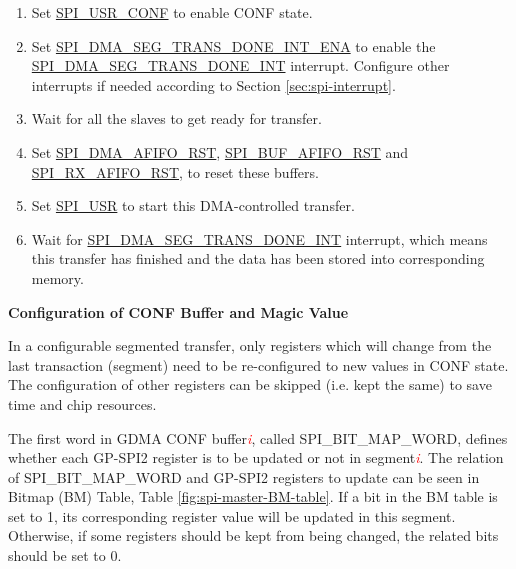 \documentclass[main\_\_EN.tex]{subfiles}
\begin{document}
\begin{enumerate}
   \item Set \hyperref[fielddesc:SPIUSRCONF]{SPI\_USR\_CONF} to enable CONF state.
   \item Set \hyperref[fielddesc:SPIDMASEGTRANSDONEINTENA]{SPI\_DMA\_SEG\_TRANS\_DONE\_INT\_ENA} to enable the \hyperref[int:SPIDMASEGTRANSDONEINT]{SPI\_DMA\_SEG\_TRANS\_DONE\_INT} interrupt. Configure other interrupts if needed according to Section \ref{sec:spi-interrupt}.

   \item Wait for all the slaves to get ready for transfer.

    \item Set \hyperref[fielddesc:SPIDMAAFIFORST]{SPI\_DMA\_AFIFO\_RST}, \hyperref[fielddesc:SPIBUFAFIFORST]{SPI\_BUF\_AFIFO\_RST} and \hyperref[fielddesc:SPIRXAFIFORST]{SPI\_RX\_AFIFO\_RST}, to reset these buffers.

   \item Set \hyperref[fielddesc:SPIUSR]{SPI\_USR} to start this DMA-controlled transfer.

   \item Wait for \hyperref[int:SPIDMASEGTRANSDONEINT]{SPI\_DMA\_SEG\_TRANS\_DONE\_INT} interrupt, which means this transfer has finished and the data has been stored into corresponding memory.
 \end{enumerate}

\textbf{Configuration of CONF Buffer and Magic Value}\label{sec:SCT-CONF-Buffer}

In a configurable segmented transfer, only registers which will change from the last transaction (segment) need to be re-configured to new values in CONF state. The configuration of other registers can be skipped (i.e. kept the same) to save time and chip resources.

The first word in GDMA CONF buffer\textcolor{red}{\it i}, called SPI\_BIT\_MAP\_WORD, defines whether each GP-SPI2 register is to be updated or not in segment\textcolor{red}{\it i}. The relation of SPI\_BIT\_MAP\_WORD and GP-SPI2 registers to update can be seen in Bitmap (BM) Table, Table \ref{fig:spi-master-BM-table}. If a bit in the BM table is set to 1, its corresponding register value will be updated in this segment. Otherwise, if some registers should be kept from being changed, the related bits should be set to 0.
\end{document}
